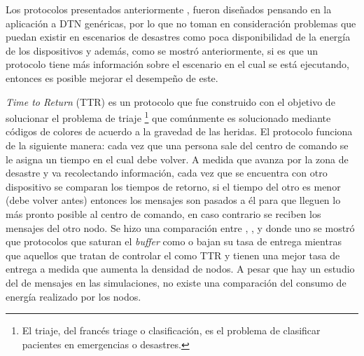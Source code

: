 
Los protocolos presentados anteriormente \protocolos, fueron diseñados
pensando en la aplicación a DTN genéricas, por lo que no toman en consideración
problemas que puedan existir en escenarios de desastres como poca disponibilidad
de la energía de los dispositivos y además, como se mostró anteriormente, si es
que un protocolo tiene más información sobre el escenario en el cual se está
ejecutando, entonces es posible mejorar el desempeño de este.


\textit{Time to Return} (TTR) \cite{Mart2009} es un protocolo que fue construido
con el objetivo de solucionar el problema de triaje \footnote{El triaje, del
francés triage o clasificación, es el problema de clasificar pacientes en
emergencias o desastres.} que comúnmente es solucionado mediante códigos de
colores de acuerdo a la gravedad de las heridas. El protocolo funciona de la
siguiente manera: cada vez que una persona sale del centro de comando se le
asigna un tiempo en el cual debe volver. A medida que avanza por la zona de
desastre y va recolectando información, cada vez que se encuentra con otro
dispositivo se comparan los tiempos de retorno, si el tiempo del otro es menor
(debe volver antes) entonces los mensajes son pasados a él para que lleguen lo
más pronto posible al centro de comando, en caso contrario se reciben los
mensajes del otro nodo. Se hizo una comparación
\cite{martin-campillo_evaluating_2013} entre \maxprop{}, \epidemic{}, \prophet{}
y \ttr{} donde uno se mostró que protocolos que saturan el \textit{buffer} como
\epidemic{} o \prophet{} bajan su tasa de entrega mientras que aquellos que
tratan de controlar el \overhead{} como TTR y \maxprop{} tienen una mejor tasa
de entrega a medida que aumenta la densidad de nodos. A pesar que hay un estudio
del \overhead{} de mensajes en las simulaciones, no existe una comparación del
consumo de energía realizado por los nodos.


